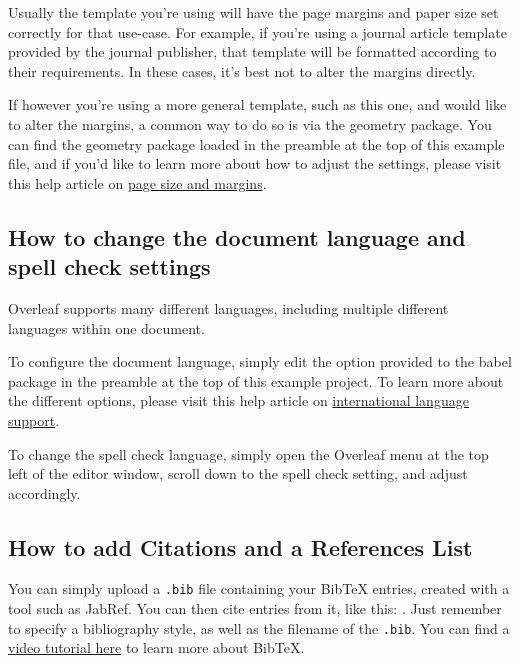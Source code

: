 \documentclass{article}
\begin{document}
Usually the template you're using will have the page margins and paper size set correctly for that use-case. For example, if you're using a journal article template provided by the journal publisher, that template will be formatted according to their requirements. In these cases, it's best not to alter the margins directly.

If however you're using a more general template, such as this one, and would like to alter the margins, a common way to do so is via the geometry package. You can find the geometry package loaded in the preamble at the top of this example file, and if you'd like to learn more about how to adjust the settings, please visit this help article on \href{https://www.overleaf.com/learn/latex/page_size_and_margins}{page size and margins}.

\subsection{How to change the document language and spell check settings}

Overleaf supports many different languages, including multiple different languages within one document. 

To configure the document language, simply edit the option provided to the babel package in the preamble at the top of this example project. To learn more about the different options, please visit this help article on \href{https://www.overleaf.com/learn/latex/International_language_support}{international language support}.

To change the spell check language, simply open the Overleaf menu at the top left of the editor window, scroll down to the spell check setting, and adjust accordingly.

\subsection{How to add Citations and a References List}

You can simply upload a \verb|.bib| file containing your BibTeX entries, created with a tool such as JabRef. You can then cite entries from it, like this: \cite{greenwade93}. Just remember to specify a bibliography style, as well as the filename of the \verb|.bib|. You can find a \href{https://www.overleaf.com/help/97-how-to-include-a-bibliography-using-bibtex}{video tutorial here} to learn more about BibTeX.



\end{document}
